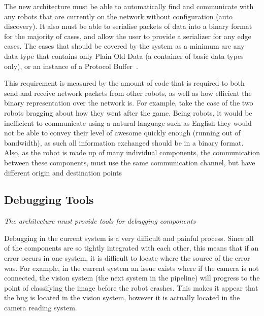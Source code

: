 \documentclass[english,12pt]{scrartcl}
\newcommand{\requirement}[1]{\textit{#1}}
\begin{document}
            The new architecture must be able to automatically find and communicate with any robots
            that are currently on the network without configuration (auto discovery). It also must
            be able to serialise packets of data into a binary format for the majority of cases, and
            allow the user to provide a serializer for any edge cases. The cases that should be
            covered by the system as a minimum are any data type that contains only Plain Old Data
            (a container of basic data types only), or an instance of a 
            Protocol Buffer~\cite{protobuf}.
            
            This requirement is measured by the amount of code that is required to both send and
            receive network packets from other robots, as well as how efficient the binary
            representation over the network is. For example, take the case of the two robots
            bragging about how they went after the game. Being robots, it would be inefficient to
            communicate using a natural language such as English they would not be able to convey
            their level of awesome quickly enough (running out of bandwidth), as such all
            information exchanged should be in a binary format. Also, as the robot is made up of
            many individual components, the communication between these components, must use the
            same communication channel, but have different origin and destination points 

        \subsection{Debugging Tools}
            \requirement{The architecture must provide tools for debugging components}
            
            Debugging in the current system is a very difficult and painful process. Since all of
            the components are so tightly integrated with each other, this means that if an error
            occurs in one system, it is difficult to locate where the source of the error was. For
            example, in the current system an issue exists where if the camera is not connected, the 
            vision system (the next system in the pipeline) will progress to the point of
            classifying the image before the robot crashes. This makes it appear that the bug is
            located in the vision system, however it is actually located in the camera reading
            system.
             
\end{document}
